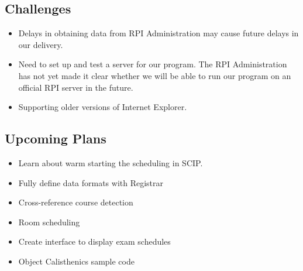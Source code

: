 \documentclass[11pt]{article}
\begin{document}
\subsection{Challenges}
\begin{itemize}
	\item Delays in obtaining data from RPI Administration may cause future delays in our delivery.
	\item Need to set up and test a server for our program. The RPI Administration has not yet made it clear whether we will be able to run our program on an official RPI server in the future.
	\item Supporting older versions of Internet Explorer.
\end{itemize}

\subsection{Upcoming Plans}
\begin{itemize}
	\item Learn about warm starting the scheduling in SCIP.
	\item Fully define data formats with Registrar
	\item Cross-reference course detection
	\item Room scheduling
	\item Create interface to display exam schedules 
	\item Object Calisthenics sample code
\end{itemize}
\end{document}
